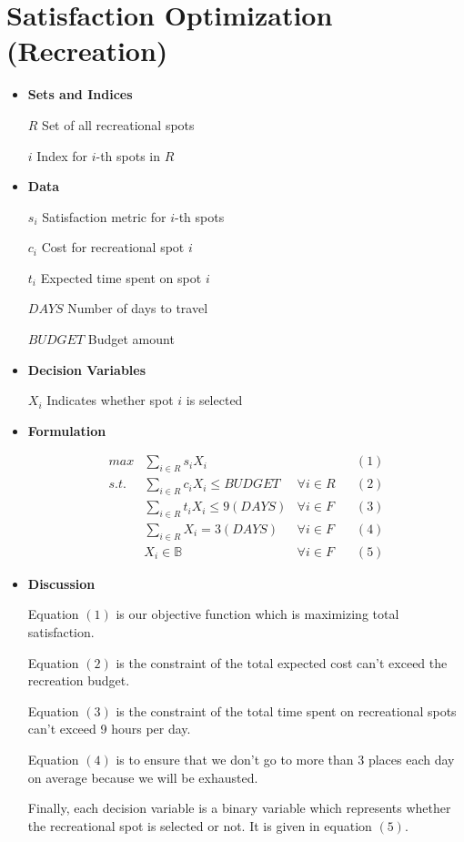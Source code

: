 \documentclass{article}
\newcommand\tabb{\tabto{10em}}
\newcommand\idt{\hspace{2mm}}
\begin{document}
	\pagebreak
	
	\section*{Satisfaction Optimization (Recreation)}
	
	\begin{itemize}
		\item \textbf{Sets and Indices} 
		
		\idt $R$ \tabb Set of all recreational spots
		
		\idt $i$ \tabb Index for $i$-th spots in $R$
		
		\item \textbf{Data}
		
		\idt $s_{i}$ \tabb Satisfaction metric for $i$-th spots
		
		\idt $c_{i}$ \tabb Cost for recreational spot $i$
		
		\idt $t_{i}$ \tabb Expected time spent on spot $i$
		
		\idt $DAYS$ \tabb Number of days to travel
		
		\idt $BUDGET$ \tabb Budget amount
		
		\item \textbf{Decision Variables}
		
		\idt $X_{i}$ \tabb Indicates whether spot $i$ is selected
		
		\item \textbf{Formulation}
		
		\[
		\begin{aligned}
			max & \sum_{i \in R} s_{i}X_{i} & & & (1) \\
			s.t. & \sum_{i \in R} c_{i}X_{i} \le BUDGET & \forall i \in R & & (2) \\
			& \sum_{i \in R} t_{i}X_{i} \le 9 (DAYS) & \forall i \in F & & (3) \\
			& \sum_{i \in R} X_{i} = 3 (DAYS) & \forall i \in F & & (4) \\
			& X_{i} \in \mathbb{B} & \forall i \in F & & (5)
		\end{aligned}
		\]
		
		\item \textbf{Discussion}
		
		Equation $(1)$ is our objective function which is maximizing total satisfaction.
		
		Equation $(2)$ is the constraint of the total expected cost can't exceed the recreation budget.
		
		Equation $(3)$ is the constraint of the total time spent on recreational spots can't exceed 9 hours per day.
		
		Equation $(4)$ is to ensure that we don't go to more than $3$ places each day on average because we will be exhausted.
		
		Finally, each decision variable is a binary variable which represents whether the recreational spot is selected or not. It is given in equation $(5)$.
		
	\end{itemize}
\end{document}
